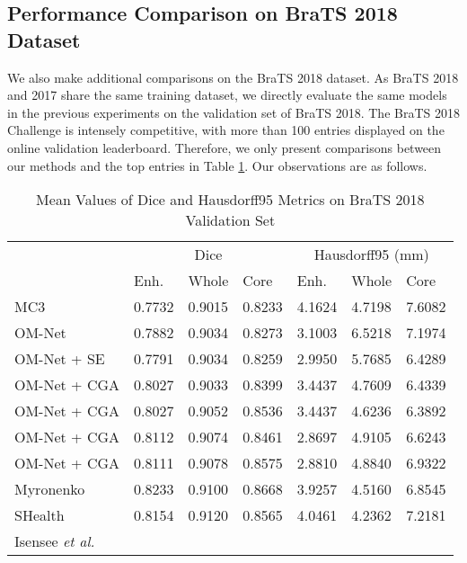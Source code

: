 \documentclass[journal,twoside]{IEEEtran}
\begin{document}
\subsection{Performance Comparison on BraTS 2018 Dataset}
We also make additional comparisons on the BraTS 2018 dataset. As BraTS 2018 and 2017 share the same training dataset, we directly evaluate the same models in the previous experiments on the validation set of BraTS 2018. The BraTS 2018 Challenge is intensely competitive, with more than 100 entries displayed on the online validation leaderboard. Therefore, we only present comparisons between our methods and the top entries in Table \ref{Table4}. Our observations are as follows.


\begin{table}
	\newcommand{\tabincell}[2]{\begin{tabular}{@{}#1@{}}#2\end{tabular}}	
	\fontsize{6.5}{14}\selectfont
	\centering
	\caption{Mean Values of Dice and Hausdorff95 Metrics on BraTS 2018 Validation Set }
	\label{Table4}
	\begin{threeparttable}
		\begin{tabular}{p{1.8cm}<{\centering}|p{0.65cm}<{\centering}|p{0.65cm}<{\centering}|p{0.65cm}<{\centering}|p{0.65cm}<{\centering}|p{0.65cm}<{\centering}|p{0.65cm}<{\centering}}\shline
			\multirow{2}{*}{Method} & \multicolumn{3}{c|}{Dice} & \multicolumn{3}{c}{Hausdorff95 (mm)}\\ 
			\cline{2-7}
			&Enh. &Whole &Core &Enh. &Whole &Core   \\
			\hline  
			MC3 &0.7732 &0.9015 &0.8233 &4.1624 &4.7198 &7.6082  \\				
			\hline  
			OM-Net &0.7882 &0.9034 &0.8273 &3.1003 &6.5218 &7.1974  \\
			\hline
			OM-Net + SE  &0.7791 &0.9034 &0.8259 &2.9950 &5.7685 &6.4289 \\
			\hline
			OM-Net + CGA  &0.8027 &0.9033 &0.8399 &3.4437 &4.7609 &6.4339  \\
			\hline
			OM-Net + CGA  &0.8027 &0.9052 &0.8536 &3.4437 &4.6236 &6.3892  \\				
			\hline
			OM-Net + CGA\tnote{}   &0.8112 &0.9074 &0.8461 &2.8697 &4.9105 &6.6243  \\
			\hline
			OM-Net + CGA &0.8111 &0.9078 &0.8575 &2.8810 &4.8840 &6.9322  \\				
			\hline	
			\hline				
			Myronenko  \cite{myronenko20183d} &0.8233 &0.9100 &0.8668 &3.9257 &4.5160 &6.8545\\ 
			\hline			     		
			SHealth &0.8154 &0.9120 &0.8565 &4.0461 &4.2362 &7.2181 \\
			\hline
			Isensee \emph{et al.} \cite{isensee2018no} 
			

\end{tabular}
\end{threeparttable}
\end{table}
\end{document}
